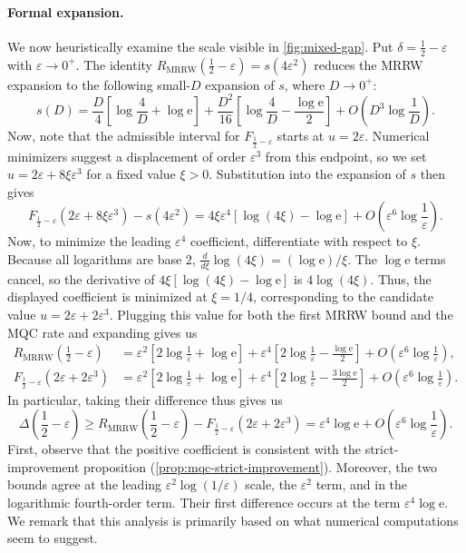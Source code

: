 \documentclass[11pt]{article}
\renewcommand{\geq}{\geqslant}
\theoremstyle{remark}
\newcommand{\MRRW}{R_{\mathrm{MRRW}}}
\newcommand{\eps}{\varepsilon}
\begin{document}
\paragraph{Formal expansion.} We now heuristically examine the scale visible in \cref{fig:mixed-gap}. Put $\delta = \frac{1}{2}-\eps$ with $\eps \to 0^+$. The identity $\MRRW(\frac{1}{2}-\eps) = s(4\eps^2)$ reduces the MRRW expansion to the following small-$D$ expansion of $s$, where $D \to 0^+$:
\begin{equation*}
s(D) = \frac{D}{4}\left[\log{\frac{4}{D}}+\log{\mathrm{e}}\right]
+\frac{D^2}{16}\left[\log{\frac{4}{D}}-\frac{\log{\mathrm{e}}}{2}\right]
+O\left(D^3\log{\frac{1}{D}}\right).
\end{equation*}
Now, note that the admissible interval for $F_{\frac{1}{2}-\eps}$ starts at $u = 2\eps$. Numerical minimizers suggest a displacement of order $\eps^3$ from this endpoint, so we set $u = 2\eps+8\xi\eps^3$ for a fixed value $\xi > 0$. Substitution into the expansion of $s$ then gives
\begin{equation*}
F_{\frac{1}{2}-\eps}(2\eps+8\xi\eps^3)-s(4\eps^2)
= 4\xi\eps^4\left[\log(4\xi)-\log{\mathrm{e}}\right]
+O\left(\eps^6\log{\frac{1}{\eps}}\right).
\end{equation*}
Now, to minimize the leading $\eps^4$ coefficient, differentiate with respect to $\xi$. Because all logarithms are base $2$, $\frac{d}{d\xi}\log(4\xi) = (\log{\mathrm{e}})/\xi$. The $\log{\mathrm{e}}$ terms cancel, so the derivative of $4\xi[\log(4\xi)-\log{\mathrm{e}}]$ is $4\log(4\xi)$. Thus, the displayed coefficient is minimized at $\xi = 1/4$, corresponding to the candidate value $u = 2\eps+2\eps^3$. Plugging this value for both the first MRRW bound and the MQC rate and expanding gives us
\begin{align*}
\MRRW\left(\frac{1}{2}-\eps\right)
&= \eps^2\left[2\log{\frac{1}{\eps}}+\log{\mathrm{e}}\right]
+\eps^4\left[2\log{\frac{1}{\eps}}-\frac{\log{\mathrm{e}}}{2}\right]
+O\left(\eps^6\log{\frac{1}{\eps}}\right), \\
F_{\frac{1}{2}-\eps}(2\eps+2\eps^3)
&= \eps^2\left[2\log{\frac{1}{\eps}}+\log{\mathrm{e}}\right]
+\eps^4\left[2\log{\frac{1}{\eps}}-\frac{3\log{\mathrm{e}}}{2}\right]
+O\left(\eps^6\log{\frac{1}{\eps}}\right).
\end{align*}
In particular, taking their difference thus gives us
\begin{equation*}
\Delta\left(\frac{1}{2} - \eps\right)
\geq
\MRRW\left(\frac{1}{2}-\eps\right)
-F_{\frac{1}{2}-\eps}(2\eps+2\eps^3)
= \eps^4\log{\mathrm{e}}
+O\left(\eps^6\log{\frac{1}{\eps}}\right).
\end{equation*}
First, observe that the positive coefficient is consistent with the strict-improvement proposition (\cref{prop:mqc-strict-improvement}). Moreover, the two bounds agree at the leading $\eps^2\log(1/\eps)$ scale, the $\eps^2$ term, and in the logarithmic fourth-order term. Their first difference occurs at the term $\eps^4\log{\mathrm{e}}$. We remark that this analysis is primarily based on what numerical computations seem to suggest.
\end{document}
